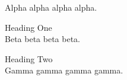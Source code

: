 \documentclass[11pt]{article}
\begin{document}
Alpha alpha alpha alpha.

{\large Heading One}\\[-6pt]
Beta beta beta beta.

{\large Heading Two}\\[-6pt]
Gamma gamma gamma gamma.
\end{document}
